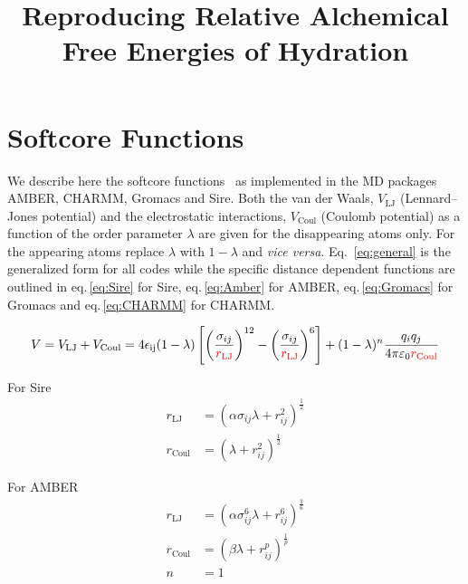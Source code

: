 \documentclass[journal=jctcce,manuscript=suppinfo]{achemso}
\title{Reproducing Relative Alchemical Free Energies of Hydration}
\begin{document}
\maketitle



\section{Softcore Functions}
\label{sec:softcores}

We describe here the softcore functions~\cite{beutler_avoiding_1994,
  zacharias_separationshifted_1994} as implemented in the MD packages
AMBER, CHARMM, Gromacs and Sire.  Both the van der Waals,
$V_{\mathrm{LJ}}$ (Lennard--Jones potential) and the electrostatic
interactions, $V_{\mathrm{Coul}}$ (Coulomb potential) as a function of
the order parameter $\lambda$ are given for the disappearing atoms
only.  For the appearing atoms replace $\lambda$ with $1 - \lambda$
and \emph{vice versa}.  Eq.\ \eqref{eq:general} is the generalized
form for all codes while the specific distance dependent functions are
outlined in eq.\,\eqref{eq:Sire} for Sire, eq.\,\eqref{eq:Amber} for
AMBER, eq.\,\eqref{eq:Gromacs} for Gromacs and eq.\,\eqref{eq:CHARMM}
for CHARMM.

\begin{equation}
  V = V_{\mathrm{LJ}} + V_{\mathrm{Coul}} =
  4\epsilon_{\mathrm{ij}}(1 - \lambda) \left[ \left(
      \frac{\sigma_{ij}}{\textcolor{red}{r_{\mathrm{LJ}}}}
    \right)^{12} - \left(
      \frac{\sigma_{ij}}{\textcolor{red}{r_{\mathrm{LJ}}}} \right)^{
      6} \right] +
  (1 - \lambda)^{n} \frac{q_{i}q_{j}}
  {4\pi\varepsilon_{0}\textcolor{red}{r_{\mathrm{Coul}}}}
  \label{eq:general}
\end{equation}

For Sire
\begin{equation}
  \begin{split}
    r_{\mathrm{LJ}} &= (\alpha\sigma_{ij}\lambda + r_{ij}^2)^{\frac{1}{2}} \\
    r_{\mathrm{Coul}} &=  (\lambda + r_{ij}^2)^{\frac{1}{2}}
  \end{split}
  \label{eq:Sire}
\end{equation}

For AMBER
\begin{equation}
  \begin{split}
    r_{\mathrm{LJ}} &= (\alpha \sigma_{ij}^{6} \lambda + %
                         r_{ij}^6)^{\frac{1}{6}} \\
    r_{\mathrm{Coul}} &= (\beta\lambda + r_{ij}^{p})^{\frac{1}{p}} \\
    n &= 1
  \end{split}
  \label{eq:Amber}
\end{equation}
\end{document}
